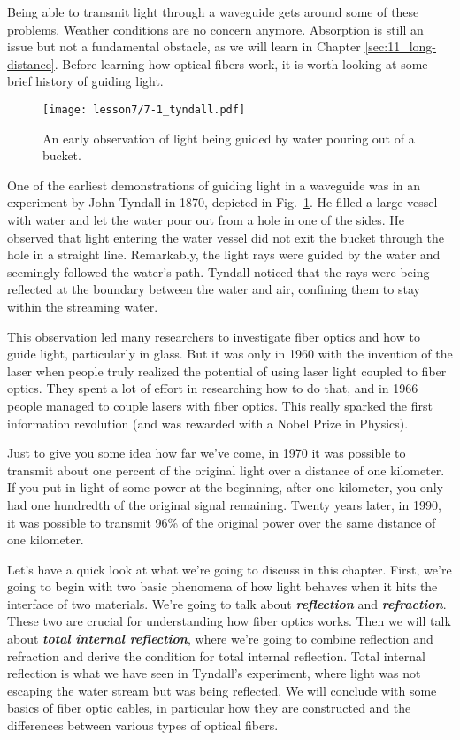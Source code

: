 Being able to transmit light through a waveguide gets around some of these problems.
Weather conditions are no concern anymore.
Absorption is still an issue but not a fundamental obstacle, as we will learn in Chapter \ref{sec:11_long-distance}.
Before learning how optical fibers work, it is worth looking at some brief history of guiding light.

\begin{figure}[t]
    \centering
    \texttt{[image: lesson7/7-1\_tyndall.pdf]}
    \caption[Tyndall's experiment]{An early observation of light being guided by water pouring out of a bucket.}
    \label{fig:7-1_tyndall}
\end{figure}

One of the earliest demonstrations of guiding light in a waveguide was in an experiment by John Tyndall in 1870, depicted in Fig.~\ref{fig:7-1_tyndall}.
He filled a large vessel with water and let the water pour out from a hole in one of the sides.
He observed that light entering the water vessel did not exit the bucket through the hole in a straight line.
Remarkably, the light rays were guided by the water and seemingly followed the water's path.
Tyndall noticed that the rays were being reflected at the boundary between the water and air, confining them to stay within the streaming water.

This observation led many researchers to investigate fiber optics and how to guide light, particularly in glass.
But it was only in 1960 with the invention of the laser when people truly realized the potential of using laser light coupled to fiber optics.
They spent a lot of effort in researching how to do that, and in 1966 people managed to couple lasers with fiber optics.
This really sparked the first information revolution (and was rewarded with a Nobel Prize in Physics).

Just to give you some idea how far we've come, in 1970 it was possible to transmit about one percent of the original light over a distance of one kilometer.
If you put in light of some power at the beginning, after one kilometer, you only had one hundredth of the original signal remaining.
Twenty years later, in 1990, it was possible to transmit 96\% of the original power over the same distance of one kilometer.

Let's have a quick look at what we're going to discuss in this chapter.
First, we're going to begin with two basic phenomena of how light behaves when it hits the interface of two materials.
We're going to talk about \textbf{\emph{reflection}} and \textbf{\emph{refraction}}.
These two are crucial for understanding how fiber optics works.
Then we will talk about \textbf{\emph{total internal reflection}}, where we're going to combine reflection and refraction and derive the condition for total internal reflection.
Total internal reflection is what we have seen in Tyndall's experiment, where light was not escaping the water stream but was being reflected.
We will conclude with some basics of fiber optic cables, in particular how they are constructed and the differences between various types of optical fibers.


